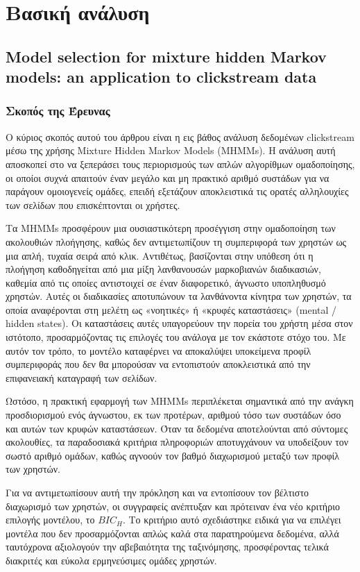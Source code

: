 \documentclass[12pt,a4paper]{article}
\begin{document}
	\section{Βασική ανάλυση}
	\subsection{Model selection for mixture hidden Markov models: an application to clickstream data }
	
	
	\subsubsection{Σκοπός της Έρευνας}
	Ο κύριος σκοπός αυτού του άρθρου \cite{MMHM} είναι η εις βάθος ανάλυση δεδομένων clickstream μέσω της χρήσης Mixture Hidden Markov Models (MHMMs). Η ανάλυση αυτή αποσκοπεί στο να ξεπεράσει τους περιορισμούς των απλών αλγορίθμων ομαδοποίησης, οι οποίοι συχνά απαιτούν έναν μεγάλο και μη πρακτικό αριθμό συστάδων για να παράγουν ομοιογενείς ομάδες, επειδή εξετάζουν αποκλειστικά τις ορατές αλληλουχίες των σελίδων που επισκέπτονται οι χρήστες. 
	
	Τα MHMMs προσφέρουν μια ουσιαστικότερη προσέγγιση στην ομαδοποίηση των ακολουθιών πλοήγησης, καθώς δεν αντιμετωπίζουν τη συμπεριφορά των χρηστών ως μια απλή, τυχαία σειρά από κλικ. Αντιθέτως, βασίζονται στην υπόθεση ότι η πλοήγηση καθοδηγείται από μια μίξη λανθανουσών μαρκοβιανών διαδικασιών, καθεμία από τις οποίες αντιστοιχεί σε έναν διαφορετικό, άγνωστο υποπληθυσμό χρηστών. Αυτές οι διαδικασίες αποτυπώνουν τα λανθάνοντα κίνητρα των χρηστών, τα οποία αναφέρονται στη μελέτη ως «νοητικές» ή «κρυφές καταστάσεις» (mental / hidden states). Οι καταστάσεις αυτές υπαγορεύουν την πορεία του χρήστη μέσα στον ιστότοπο, προσαρμόζοντας τις επιλογές του ανάλογα με τον εκάστοτε στόχο του. Με αυτόν τον τρόπο, το μοντέλο καταφέρνει να αποκαλύψει υποκείμενα προφίλ συμπεριφοράς που δεν θα μπορούσαν να εντοπιστούν αποκλειστικά από την επιφανειακή καταγραφή των σελίδων.
	
	Ωστόσο, η πρακτική εφαρμογή των MHMMs περιπλέκεται σημαντικά από την ανάγκη προσδιορισμού ενός άγνωστου, εκ των προτέρων, αριθμού τόσο των συστάδων όσο και αυτών των κρυφών καταστάσεων. Όταν τα δεδομένα αποτελούνται από σύντομες ακολουθίες, τα παραδοσιακά κριτήρια πληροφοριών αποτυγχάνουν να υποδείξουν τον σωστό αριθμό ομάδων, καθώς αγνοούν τον βαθμό διαχωρισμού μεταξύ των προφίλ των χρηστών. 
	
	Για να αντιμετωπίσουν αυτή την πρόκληση και να εντοπίσουν τον βέλτιστο διαχωρισμό των χρηστών, οι συγγραφείς ανέπτυξαν και πρότειναν ένα νέο κριτήριο επιλογής μοντέλου, το $BIC_H$. Το κριτήριο αυτό σχεδιάστηκε ειδικά για να επιλέγει μοντέλα που δεν προσαρμόζονται απλώς καλά στα παρατηρούμενα δεδομένα, αλλά ταυτόχρονα αξιολογούν την αβεβαιότητα της ταξινόμησης, προσφέροντας τελικά διακριτές και εύκολα ερμηνεύσιμες ομάδες χρηστών. 
	
\end{document}
